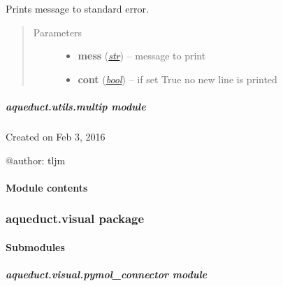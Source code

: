 \documentclass[a4paper,10pt,english]{sphinxmanual}
\begin{document}
\begin{fulllineitems}
\label{aqueduct.utils.log:aqueduct.utils.log.message}
Prints message to standard error.
\begin{quote}\begin{description}
\item[{Parameters}] \leavevmode\begin{itemize}
\item {} 
\textbf{mess} (\href{http://docs.python.org/2/library/functions.html\#str}{\emph{str}}) -- message to print

\item {} 
\textbf{cont} (\href{http://docs.python.org/2/library/functions.html\#bool}{\emph{bool}}) -- if set True no new line is printed

\end{itemize}

\end{description}\end{quote}

\end{fulllineitems}



\subparagraph{aqueduct.utils.multip module}
\label{aqueduct.utils.multip:module-aqueduct.utils.multip}\label{aqueduct.utils.multip::doc}\label{aqueduct.utils.multip:aqueduct-utils-multip-module}
Created on Feb 3, 2016

@author: tljm


\paragraph{Module contents}
\label{aqueduct.utils:module-aqueduct.utils}\label{aqueduct.utils:module-contents}

\subsubsection{aqueduct.visual package}
\label{aqueduct.visual:aqueduct-visual-package}\label{aqueduct.visual::doc}

\paragraph{Submodules}
\label{aqueduct.visual:submodules}

\subparagraph{aqueduct.visual.pymol\_connector module}
\label{aqueduct.visual.pymol_connector:module-aqueduct.visual.pymol_connector}\label{aqueduct.visual.pymol_connector::doc}\label{aqueduct.visual.pymol_connector:aqueduct-visual-pymol-connector-module}
\end{document}

